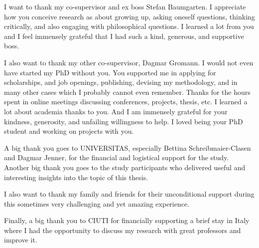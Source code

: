 \addchap{\lsAcknowledgementTitle} 


I want to thank my co-supervisor and ex boss Stefan Baumgarten. 
I appreciate how you conceive research as about growing up, asking oneself questions, thinking critically, and also engaging with philosophical questions. I learned a lot from you and I feel immensely grateful that I had such a kind, generous, and supportive boss. 


I also want to thank my other co-supervisor, Dagmar Gromann.
I would not even have started my PhD without you. You supported me in applying for scholarships, and job openings, publishing, devising my methodology, and in many other cases which I probably cannot even remember. Thanks for the hours spent in online meetings discussing conferences, projects, thesis, etc. I learned a lot about academia thanks to you. And I am immensely grateful for your kindness, generosity, and unfailing willingness to help. I loved being your PhD student and working on projects with you. 


A big thank you goes to UNIVERSITAS, especially Bettina Schreibmaier-Clasen and Dagmar Jenner, for the financial and logistical support for the study. Another big thank you goes to the study participants who delivered useful and interesting insights into the topic of this thesis. 


I also want to thank my family and friends for their unconditional support during this sometimes very challenging and yet amazing experience.


Finally, a big thank you to CIUTI for financially supporting a brief stay in Italy where I had the opportunity to discuss my research with great professors and improve it. 


